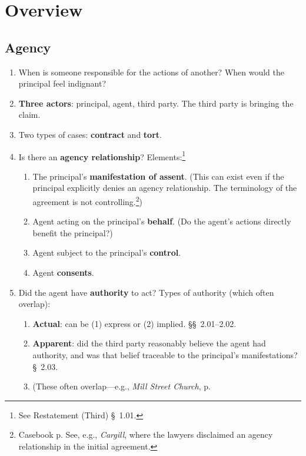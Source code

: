\section{Overview}

\subsection{Agency}

\begin{enumerate}
    \item When is someone responsible for the actions of another? When would 
    the principal feel indignant?
    \item \textbf{Three actors}: principal, agent, third party. The third 
    party is bringing the claim.
    \item Two types of cases: \textbf{contract} and \textbf{tort}.
    \item Is there an \textbf{agency relationship}? Elements:\footnote{See 
    Restatement (Third) \S\ 1.01.}
    \begin{enumerate}
        \item The principal's \textbf{manifestation of assent}. (This can 
        exist even if the principal explicitly denies an agency relationship. 
        The terminology of the agreement is not controlling.\footnote{Casebook 
        p. See, e.g., \emph{Cargill}, where the lawyers disclaimed an agency 
        relationship in the initial agreement.})
        \item Agent acting on the principal's \textbf{behalf}. (Do the agent's 
        actions directly benefit the principal?)
        \item Agent subject to the principal's \textbf{control}.
        \item Agent \textbf{consents}.
    \end{enumerate}
    \item Did the agent have \textbf{authority} to act? Types of authority 
    (which often overlap):
    \begin{enumerate}
        \item \textbf{Actual}: can be (1) express or (2) implied. \S\S\ 
        2.01--2.02.
        \item \textbf{Apparent}: did the third party reasonably believe the 
        agent had authority, and was that belief traceable to the principal's 
        manifestations? \S\ 2.03.
        \item (These often overlap---e.g., \emph{Mill Street Church}, p. 

\end{enumerate}
\end{enumerate}
